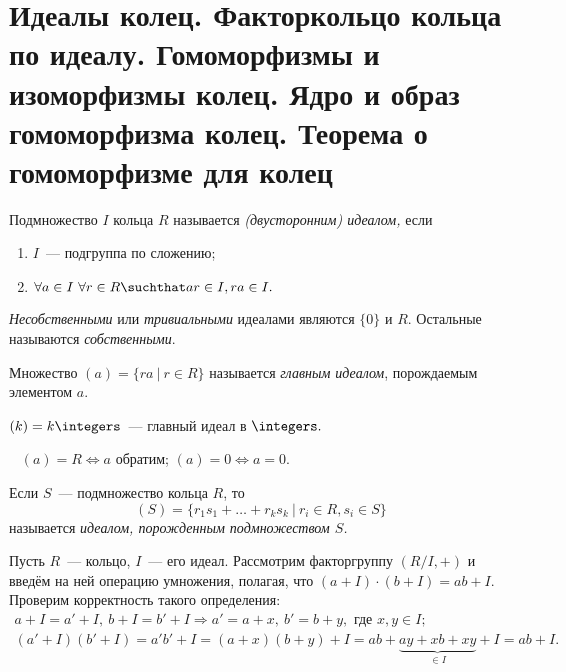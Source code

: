 	\newpage
	\section{Идеалы колец. Факторкольцо кольца по идеалу. Гомоморфизмы и изоморфизмы колец. Ядро и образ гомоморфизма колец. Теорема о гомоморфизме для колец}
	\setcounter{definition}{0}
	\begin{definition}
		Подмножество $I$ кольца $R$ называется \textit{(двусторонним) идеалом,} если
		\begin{enumerate}
			\setlength\itemsep{0.1em}
			\item $I$~--- подгруппа по сложению;
			\item $\forall a \in I \ \forall r \in R\suchthat ar \in I, ra \in I.$
		\end{enumerate} \n
		\textit{Несобственными} или \textit{тривиальными} идеалами являются $\{0\}$ и $R$. Остальные называются \textit{собственными}.
	\end{definition}
	\begin{definition}
		Множество ${(a) = \{ra \ | \ r \in R\}}$ называется \textit{главным идеалом}, порождаемым элементом $a.$
	\end{definition}
	\begin{exmpl*}
		${(k) = k\integers}$~--- главный идеал в $\integers.$
	\end{exmpl*}
	\begin{remark}
		\ \newline
		$(a) = R \Leftrightarrow a$ обратим; \newline
		$(a) = 0 \Leftrightarrow a = 0.$
	\end{remark}
	\begin{definition}
		Если $S$~--- подмножество кольца $R$, то
		\begin{equation*}
			(S) = \{r_1 s_1 + \ldots + r_k s_k \ | \ r_i \in R, s_i \in S\}
		\end{equation*}
		называется \textit{идеалом, порожденным подмножеством $S$.}
	\end{definition}
	Пусть $R$~--- кольцо, $I$~--- его идеал. \n
	Рассмотрим факторгруппу $(R/I, +)$ и введём на ней операцию умножения, полагая, что ${(a + I) \cdot (b + I) = ab + I.}$ \n
	Проверим корректность такого определения:
	\begin{equation*}
		\begin{gathered}
			{a + I = a' + I, \ b + I = b' + I \Rightarrow a' = a + x, \ b' = b + y, \text{ где } x, y \in I;} \\
			{(a' + I)(b' + I) =  a'b' + I =(a + x)(b + y) + I = ab + \underbrace{ay + xb + xy}_{\in I} + I = ab + I.}
		\end{gathered}
	\end{equation*}
